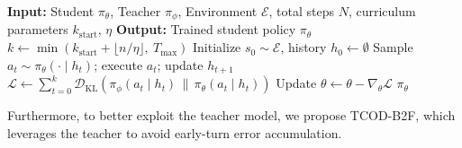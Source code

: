\documentclass{article} %
\newcommand{\ours}{TCOD\xspace}
\begin{document}
\begin{algorithm}[h]
\caption{Temporal Curriculum On-Policy Distillation: \ours-F2B}
\label{alg:tcod_f2b}
\begin{algorithmic}[1]
\STATE \textbf{Input:} Student $\pi_\theta$, Teacher $\pi_\phi$, Environment $\mathcal{E}$,
       total steps $N$, curriculum parameters $k_{\text{start}}$, $\eta$
\STATE \textbf{Output:} Trained student policy $\pi_\theta$
    \STATE $k \leftarrow \min\!\left(k_{\text{start}} + \lfloor n / \eta \rfloor,\ T_{\max}\right)$
    \STATE Initialize $s_0 \sim \mathcal{E}$, history $h_0 \leftarrow \emptyset$
        \STATE Sample $a_t \sim \pi_\theta(\cdot \mid h_t)$; execute $a_t$; update $h_{t+1}$
    \ENDFOR
    \STATE $\mathcal{L} \leftarrow \sum_{t=0}^{k} \mathcal{D}_{\mathrm{KL}}\!\left(\pi_\phi(a_t \mid h_t) \,\|\, \pi_\theta(a_t \mid h_t)\right)$
    \STATE Update $\theta \leftarrow \theta - \nabla_\theta \mathcal{L}$
\ENDFOR
\RETURN $\pi_\theta$
\end{algorithmic}
\end{algorithm}



Furthermore, to better exploit the teacher model, we propose \ours-B2F, which leverages the teacher to avoid early-turn error accumulation.
\end{document}
